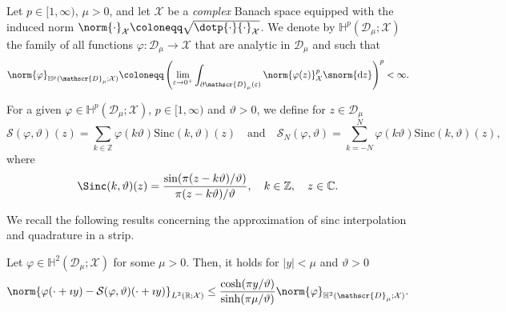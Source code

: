 \begin{definition}\label{eq:definition_H_bb}
Let $p\in[1,\infty)$, $\mu>0$, and let $\mathcal{X}$ be a {\it complex}
Banach space equipped with the induced norm $\norm{\cdot}_\mathcal{X}\coloneqq \sqrt{\dotp{\cdot}{\cdot}_\mathcal{X}}$.
We denote by $\mathbb{H}^p(\mathscr{D}_\mu;\mathcal{X})$ the family of all functions
$\varphi: \mathscr{D}_\mu \rightarrow \mathcal{X}$ that are analytic in $\mathscr{D}_\mu$
and such that
\begin{equation}
	\norm{\varphi}_{\mathbb{H}^p(\mathscr{D}_\mu;\mathcal{X})}
	\coloneqq
	\left(
        \lim_{\varepsilon \rightarrow 0^+}
		\int_{\partial \mathscr{D}_\mu(\varepsilon) }
		\norm{\varphi(z)}^p_\mathcal{X}
		\snorm{\text{d}z}
	\right)^p
	<\infty.
\end{equation}
\end{definition}

For a given $\varphi \in \mathbb{H}^p(\mathscr{D}_\mu;\mathcal{X})$, $p\in [1,\infty)$
and $\vartheta>0$, we define for $z \in \mathscr{D}_\mu$
\begin{equation}\label{eq:sinc_interpolation}
	\mathcal{S}(\varphi,\vartheta)(z)
	=
	\sum_{k\in \mathbb{Z}}
	\varphi(k \vartheta)
	\text{Sinc}(k,\vartheta)(z)
	\quad
	\text{and}
	\quad
	\mathcal{S}_N(\varphi,\vartheta)
	=
	\sum_{k=-N}^{N}
	\varphi(k \vartheta)
	\text{Sinc}(k,\vartheta)(z),
\end{equation}
where
\begin{equation}
    \Sinc(k,\vartheta)(z)
    =
    \frac{\sin(\pi(z-k \vartheta)/\vartheta)}{\pi(z-k\vartheta)/\vartheta},
    \quad
    k  \in \mathbb{Z},
    \quad
    z \in \mathbb{C}.
\end{equation}

We recall the following results concerning the approximation 
of sinc interpolation and quadrature in a strip. 

\begin{proposition}
\label{prop:sinc_interpolation}
Let $\varphi \in \mathbb{H}^2(\mathscr{D}_\mu;\mathcal{X})$ for some $\mu>0$.
Then, it holds for $|y|<\mu$ and $\vartheta>0$
\begin{equation}
	\norm{
	    \varphi(\cdot +\imath y) 
        -
        \mathcal{S}(\varphi,\vartheta)(\cdot +\imath y)
	}_{L^2(\mathbb{R};\mathcal{X})}
    \leq
    \frac{
        \cosh(\pi y/\vartheta)
    }{
        \sinh(\pi \mu/\vartheta)
    }
    \norm{\varphi}_{\mathbb{H}^2(\mathscr{D}_\mu;\mathcal{X})}.
\end{equation}
\end{proposition}

